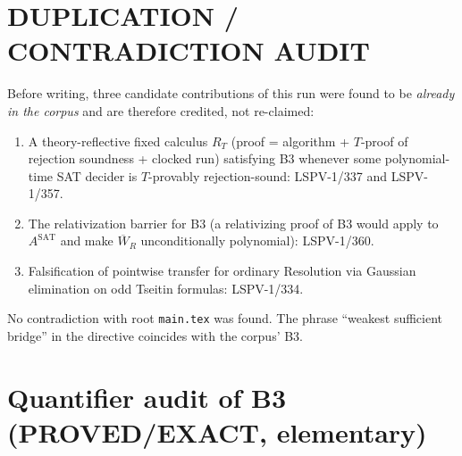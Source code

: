 \documentclass[11pt]{article}
\newcommand{\W}{\overline W}
\begin{document}
\section*{DUPLICATION / CONTRADICTION AUDIT}
Before writing, three candidate contributions of this run were found to be
\emph{already in the corpus} and are therefore credited, not re-claimed:
\begin{enumerate}
\item A theory-reflective fixed calculus $R_T$ (proof = algorithm + $T$-proof of
rejection soundness + clocked run) satisfying B3 whenever some polynomial-time
SAT decider is $T$-provably rejection-sound: LSPV-1/337 and LSPV-1/357.
\item The relativization barrier for B3 (a relativizing proof of B3 would apply
to $A^{\mathrm{SAT}}$ and make $\W_R$ unconditionally polynomial): LSPV-1/360.
\item Falsification of pointwise transfer for ordinary Resolution via
Gaussian elimination on odd Tseitin formulas: LSPV-1/334.
\end{enumerate}
No contradiction with root \texttt{main.tex} was found. The phrase ``weakest
sufficient bridge'' in the directive coincides with the corpus' B3.

\section{Quantifier audit of B3 (PROVED/EXACT, elementary)}
\end{document}
